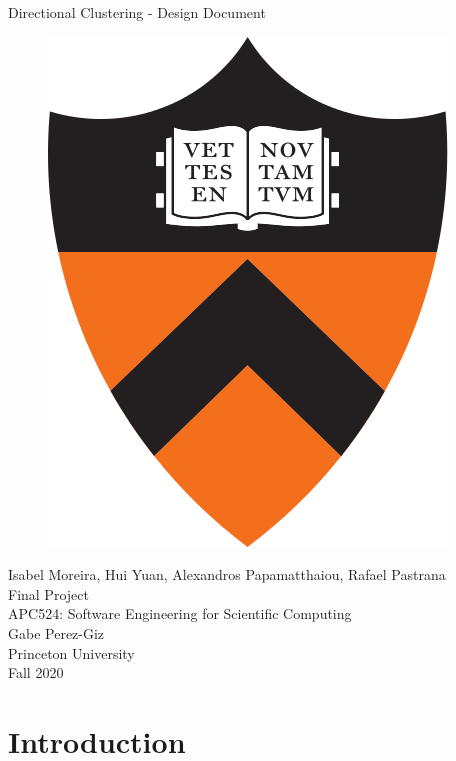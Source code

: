 \documentclass[11pt]{article}
\title{}
\author{}
\date{} %
\begin{document}
\begin{titlepage}
\centering
\vspace*{0mm}
\Large{Directional Clustering -  Design Document}
\vspace{30mm}

\begin{figure}[H]
\centering
\includegraphics[scale=0.2]{images/pton.png}
\end{figure}
\vspace{30mm}
\Large{Isabel Moreira, Hui Yuan, Alexandros Papamatthaiou, Rafael Pastrana}\\

\vspace{8mm}
\large{Final Project  \\ APC524: Software Engineering for Scientific Computing \\ }
\large{Gabe Perez-Giz}\\
\large{Princeton University \\Fall 2020\\}

\end{titlepage}


\section{Introduction}
\end{document}

